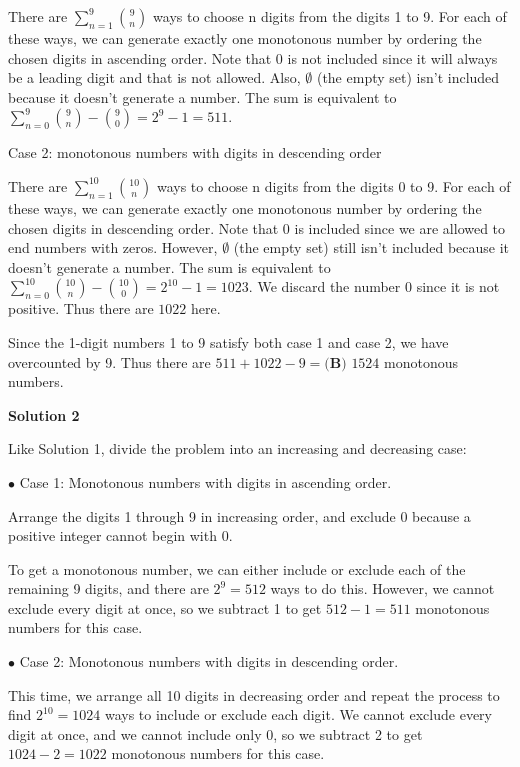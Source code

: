 \begin{enumerate}
 There are $\sum_{n=1}^{9} \binom{9}{n}$ ways to choose n digits from the digits 1 to 9. For each of these ways, we can generate exactly one monotonous number by ordering the chosen digits in ascending order. Note that 0 is not included since it will always be a leading digit and that is not allowed. Also, $\emptyset$ (the empty set) isn't included because it doesn't generate a number. The sum is equivalent to $\sum_{n=0}^{9} \binom{9}{n} -\binom{9}{0} = 2^9 - 1 = 511.$

 Case 2: monotonous numbers with digits in descending order

 There are $\sum_{n=1}^{10} \binom{10}{n}$ ways to choose n digits from the digits 0 to 9. For each of these ways, we can generate exactly one monotonous number by ordering the chosen digits in descending order. Note that 0 is included since we are allowed to end numbers with zeros. However, $\emptyset$ (the empty set) still isn't included because it doesn't generate a number. The sum is equivalent to $\sum_{n=0}^{10} \binom{10}{n} -\binom{10}{0} = 2^{10} - 1 = 1023.$ We discard the number 0 since it is not positive. Thus there are $1022$ here. 

 Since the 1-digit numbers 1 to 9 satisfy both case 1 and case 2, we have overcounted by 9. Thus there are $511+1022-9=\boxed{\textbf{(B) }  1524}$ monotonous numbers.

 



\textbf{Solution 2}

Like Solution 1, divide the problem into an increasing and decreasing case:

 $\bullet$ Case 1: Monotonous numbers with digits in ascending order.

 Arrange the digits 1 through 9 in increasing order, and exclude 0 because a positive integer cannot begin with 0.

 To get a monotonous number, we can either include or exclude each of the remaining 9 digits, and there are $2^9 = 512$ ways to do this. However, we cannot exclude every digit at once, so we subtract 1 to get $512-1=511$ monotonous numbers for this case.

 $\bullet$ Case 2: Monotonous numbers with digits in descending order.

 This time, we arrange all 10 digits in decreasing order and repeat the process to find $2^{10} = 1024$ ways to include or exclude each digit. We cannot exclude every digit at once, and we cannot include only 0, so we subtract 2 to get $1024-2=1022$ monotonous numbers for this case.


\end{enumerate}
